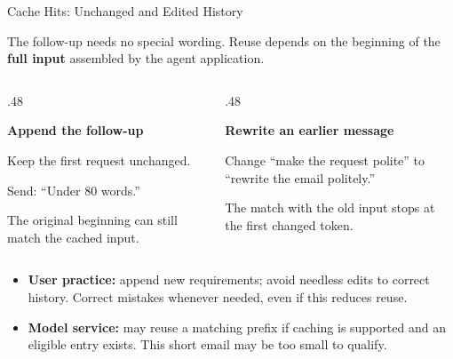 \begin{frame}{Cache Hits: Unchanged and Edited History}
\small
{}\par\smallskip
The follow-up needs no special wording. Reuse depends on the beginning of the \textbf{full input} assembled by the agent application.
\par\medskip
\begin{columns}[T,onlytextwidth]
\begin{column}{.48\textwidth}
\begin{conceptbox}\raggedright \textbf{Append the follow-up}\par\smallskip
Keep the first request unchanged.\par
Send: ``Under 80 words.''\par\medskip
The original beginning can still match the cached input.
\end{conceptbox}
\end{column}
\begin{column}{.48\textwidth}
\begin{conceptbox}\raggedright \textbf{Rewrite an earlier message}\par\smallskip
Change ``make the request polite'' to ``rewrite the email politely.''\par\medskip
The match with the old input stops at the first changed token.
\end{conceptbox}
\end{column}
\end{columns}
\par\smallskip
\begin{itemize}
\item \textbf{User practice:} append new requirements; avoid needless edits to correct history. Correct mistakes whenever needed, even if this reduces reuse.
\item \textbf{Model service:} may reuse a matching prefix if caching is supported and an eligible entry exists. This short email may be too small to qualify.
\end{itemize}
\end{frame}

